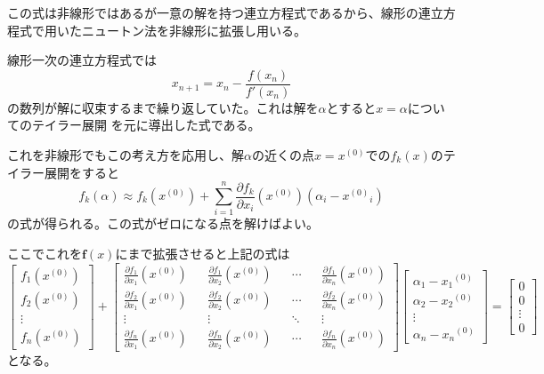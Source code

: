 \documentclass[a4paper,11pt]{jsarticle}
\begin{document}
この式は非線形ではあるが一意の解を持つ連立方程式であるから、線形の連立方程式で用いたニュートン法を非線形に拡張し用いる。

線形一次の連立方程式では
\begin{equation*}
    x_{n+1} = x_n - \frac{f(x_n)}{f'(x_n)}
\end{equation*}
の数列が解に収束するまで繰り返していた。これは解を$\alpha$とすると$x=\alpha$についてのテイラー展開
を元に導出した式である。

これを非線形でもこの考え方を応用し、解$\alpha$の近くの点$x=x^{(0)}$での$f_k(x)$のテイラー展開をすると
\begin{displaymath}
    f_k(\alpha) \approx f_k(x^{(0)}) + \sum_{i=1}^{n}\frac{\partial f_k}{\partial x_i}(x^{(0)})(\alpha_i - {x^{(0)}}_i)
\end{displaymath}
の式が得られる。この式がゼロになる点を解けばよい。

ここでこれを$\textbf{f}(x)$にまで拡張させると上記の式は
\begin{equation*}
    \begin{bmatrix}
        f_1(x^{(0)}) \\ f_2(x^{(0)}) \\ \vdots \\ f_n(x^{(0)})
    \end{bmatrix}
    +
    \begin{bmatrix}
        \frac{\partial f_1}{\partial x_1}(x^{(0)}) &  & \frac{\partial f_1}{\partial x_2}(x^{(0)}) &  & \cdots &  & \frac{\partial f_1}{\partial x_n}(x^{(0)}) \\
        \frac{\partial f_2}{\partial x_1}(x^{(0)}) &  & \frac{\partial f_2}{\partial x_2}(x^{(0)}) &  & \cdots &  & \frac{\partial f_2}{\partial x_n}(x^{(0)}) \\
        \vdots                                     &  & \vdots                                     &  & \ddots &  & \vdots                                     \\
        \frac{\partial f_n}{\partial x_1}(x^{(0)}) &  & \frac{\partial f_n}{\partial x_2}(x^{(0)}) &  & \cdots &  & \frac{\partial f_n}{\partial x_n}(x^{(0)})
    \end{bmatrix}
    \begin{bmatrix}
        \alpha_1 - {x_1}^{(0)} \\ \alpha_2 - {x_2}^{(0)} \\ \vdots \\ \alpha_n - {x_n}^{(0)}
    \end{bmatrix}
    =
    \begin{bmatrix}
        0 \\ 0 \\ \vdots \\ 0
    \end{bmatrix}
\end{equation*}
となる。
\end{document}
